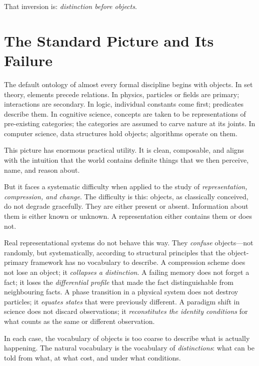 \documentclass[12pt, letterpaper]{article}
\theoremstyle{remark}
\begin{document}
That inversion is: \emph{distinction before objects}.

\section{The Standard Picture and Its Failure}

The default ontology of almost every formal discipline begins with objects.
In set theory, elements precede relations.  In physics, particles or fields
are primary; interactions are secondary.  In logic, individual constants
come first; predicates describe them.  In cognitive science, concepts are
taken to be representations of pre-existing categories; the categories are
assumed to carve nature at its joints.  In computer science, data structures
hold objects; algorithms operate on them.

This picture has enormous practical utility.  It is clean, composable, and
aligns with the intuition that the world contains definite things that we
then perceive, name, and reason about.

But it faces a systematic difficulty when applied to the study of
\emph{representation, compression, and change}.  The difficulty is this:
objects, as classically conceived, do not degrade gracefully.  They are
either present or absent.  Information about them is either known or
unknown.  A representation either contains them or does not.

Real representational systems do not behave this way.  They \emph{confuse}
objects---not randomly, but systematically, according to structural
principles that the object-primary framework has no vocabulary to describe.
A compression scheme does not lose an object; it \emph{collapses a
distinction}.  A failing memory does not forget a fact; it loses the
\emph{differential profile} that made the fact distinguishable from
neighbouring facts.  A phase transition in a physical system does not
destroy particles; it \emph{equates states} that were previously different.
A paradigm shift in science does not discard observations; it
\emph{reconstitutes the identity conditions} for what counts as the same
or different observation.

In each case, the vocabulary of objects is too coarse to describe what is
actually happening.  The natural vocabulary is the vocabulary of
\emph{distinctions}: what can be told from what, at what cost, and under
what conditions.
\end{document}
